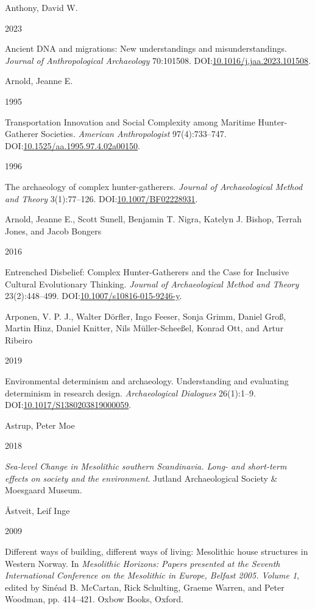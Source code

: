 \documentclass[
  12pt,
  a4paper,
  oneside]{book}
\newlength{\cslhangindent}
\newlength{\csllabelwidth}
\newlength{\cslentryspacingunit} %
\newenvironment{CSLReferences}[2] %
 {%
  \setlength{\parindent}{0pt}
  \ifodd #1
  \let\oldpar\par
  \def\par{\hangindent=\cslhangindent\oldpar}
  \fi
  \setlength{\parskip}{#2\cslentryspacingunit}
 }%
 {}
\newcommand{\CSLBlock}[1]{#1\hfill\break}
\newcommand{\CSLLeftMargin}[1]{\parbox[t]{\csllabelwidth}{#1}}
\newcommand{\CSLRightInline}[1]{\parbox[t]{\linewidth - \csllabelwidth}{#1}\break}
\begin{document}
\begin{CSLReferences}{0}{0}
\leavevmode{}%
\CSLBlock{Anthony, David W.}
\CSLLeftMargin{ 2023}%
\CSLRightInline{Ancient DNA and migrations: New understandings and misunderstandings. \emph{Journal of Anthropological Archaeology} 70:101508. DOI:\href{https://doi.org/10.1016/j.jaa.2023.101508}{10.1016/j.jaa.2023.101508}.}

\leavevmode{}%
\CSLBlock{Arnold, Jeanne E.}
\CSLLeftMargin{ 1995}%
\CSLRightInline{{Transportation Innovation and Social Complexity among Maritime Hunter-Gatherer Societies}. \emph{American Anthropologist} 97(4):733--747. DOI:\href{https://doi.org/10.1525/aa.1995.97.4.02a00150}{10.1525/aa.1995.97.4.02a00150}.}

\leavevmode{}%
\CSLLeftMargin{ 1996 }%
\CSLRightInline{{The archaeology of complex hunter-gatherers}. \emph{Journal of Archaeological Method and Theory} 3(1):77--126. DOI:\href{https://doi.org/10.1007/BF02228931}{10.1007/BF02228931}.}

\leavevmode{}%
\CSLBlock{Arnold, Jeanne E., Scott Sunell, Benjamin T. Nigra, Katelyn J. Bishop, Terrah Jones, and Jacob Bongers}
\CSLLeftMargin{ 2016}%
\CSLRightInline{{Entrenched Disbelief: Complex Hunter-Gatherers and the Case for Inclusive Cultural Evolutionary Thinking}. \emph{Journal of Archaeological Method and Theory} 23(2):448--499. DOI:\href{https://doi.org/10.1007/s10816-015-9246-y}{10.1007/s10816-015-9246-y}.}

\leavevmode{}%
\CSLBlock{Arponen, V. P. J., Walter Dörfler, Ingo Feeser, Sonja Grimm, Daniel Groß, Martin Hinz, Daniel Knitter, Nils Müller-Scheeßel, Konrad Ott, and Artur Ribeiro}
\CSLLeftMargin{ 2019}%
\CSLRightInline{{Environmental determinism and archaeology. Understanding and evaluating determinism in research design}. \emph{Archaeological Dialogues} 26(1):1--9. DOI:\href{https://doi.org/10.1017/S1380203819000059}{10.1017/S1380203819000059}.}

\leavevmode{}%
\CSLBlock{Astrup, Peter Moe}
\CSLLeftMargin{ 2018}%
\CSLRightInline{\emph{{Sea-level Change in Mesolithic southern Scandinavia. Long- and short-term effects on society and the environment}}. Jutland Archaeological Society \& Moesgaard Museum.}

\leavevmode{}%
\CSLBlock{Åstveit, Leif Inge}
\CSLLeftMargin{ 2009}%
\CSLRightInline{{Different ways of building, different ways of living: Mesolithic house structures in Western Norway}. In \emph{{Mesolithic Horizons: Papers presented at the Seventh International Conference on the Mesolithic in Europe, Belfast 2005. Volume 1}}, edited by Sinéad B. McCartan, Rick Schulting, Graeme Warren, and Peter Woodman, pp. 414--421. Oxbow Books, Oxford.}


\end{CSLReferences}
\end{document}

